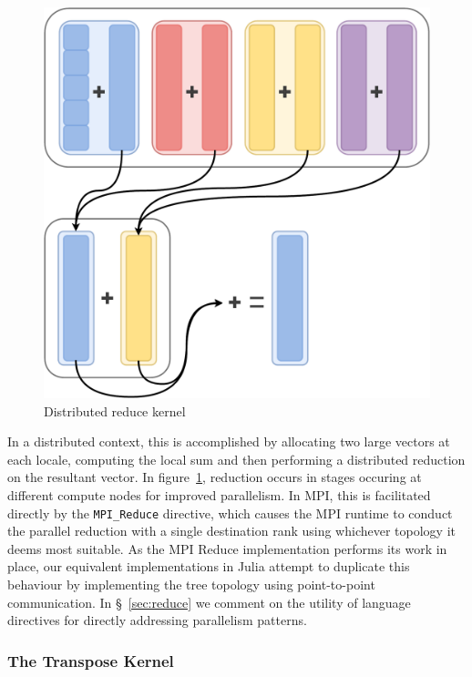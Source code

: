 \documentclass{juliacon}
\begin{document}
\begin{figure}[htb]
	\includegraphics[width=\linewidth]{figs/Reduce.pdf}
	\caption{Distributed reduce kernel}
	\label{fig:reduce-diagram}
\end{figure}

In a distributed context, this is accomplished by allocating two large
vectors at each locale, computing the local sum and then performing a
distributed reduction on the resultant vector. In figure~\ref{fig:reduce-diagram}, reduction occurs in stages occuring at different compute nodes for improved parallelism. In MPI, this is
facilitated directly by the \texttt{MPI\_Reduce} directive, which
causes the MPI runtime to conduct the parallel reduction with a single
destination rank using whichever topology it deems most suitable. As the
MPI Reduce implementation performs its work in place, our equivalent
implementations in Julia attempt to duplicate this behaviour by
implementing the tree topology using point-to-point communication. In
\S~\ref{sec:reduce} we comment on the utility of language
directives for directly addressing parallelism patterns.

\subsubsection{The Transpose Kernel}
\label{sec:transpose-kernel}
\end{document}
